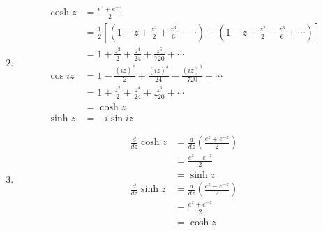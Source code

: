 \documentclass{article}
\begin{document}
\begin{enumerate}
  \setcounter{enumi}{1}
  \item

        \begin{align*}
          \cosh z  & = \frac{e^z + e ^{-z}}{2}                                                                                                                                  \\
                   & = \frac{1}{2} \left[ \left( 1 + z + \frac{z^2}{2} + \frac{z^3}{6} + \cdots \right) + \left( 1 - z + \frac{z^2}{2} - \frac{z^3}{6} + \cdots \right) \right] \\
                   & = 1 + \frac{z^2}{2} + \frac{z^4}{24} + \frac{z^6}{720} + \cdots                                                                                            \\
          \cos i z & = 1 - \frac{(i z)^2}{2} + \frac{(i z)^4}{24} - \frac{(i z)^6}{720} + \cdots                                                                                \\
                   & = 1 + \frac{z^2}{2} + \frac{z^4}{24} + \frac{z^6}{720} + \cdots                                                                                            \\
                   & = \cosh z                                                                                                                                                  \\
          \sinh z  & = -i \sin i z
        \end{align*}

  \item

        \begin{align*}
          \frac{d}{d z} \cosh z & = \frac{d}{d z} \left( \frac{e^z + e^{-z}}{2} \right) \\
                                & = \frac{e^z - e^{-z}}{2}                              \\
                                & = \sinh z                                             \\
          \frac{d}{d z} \sinh z & = \frac{d}{d z} \left( \frac{e^z - e^{-z}}{2} \right) \\
                                & = \frac{e^z + e^{-z}}{2}                              \\
                                & = \cosh z
        \end{align*}


\end{enumerate}
\end{document}

